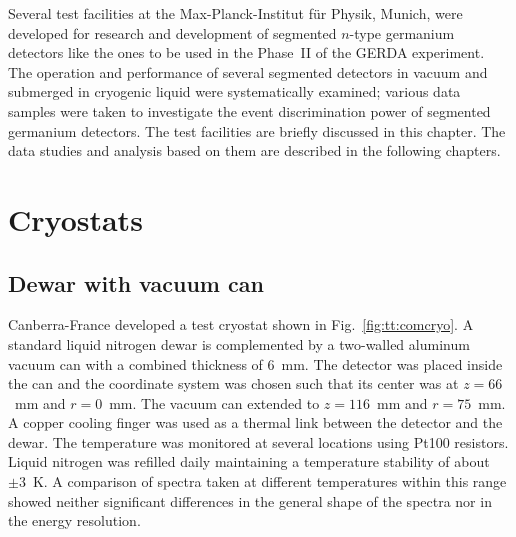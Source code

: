 Several test facilities at the Max-Planck-Institut f\"ur Physik, Munich, were developed for research and development of segmented $n$-type germanium detectors like the ones to be used in the Phase~II of the GERDA experiment. The operation and performance of several segmented detectors in vacuum and submerged in cryogenic liquid were systematically examined; various data samples were taken to investigate the event discrimination power of segmented germanium detectors. The test facilities are briefly discussed in this chapter. The data studies and analysis based on them are described in the following chapters.

\section{Cryostats}
\label{sec:tt:cryo}

\subsection{Dewar with vacuum can}
\label{sec:tt:comc}
Canberra-France developed a test cryostat shown in Fig.~\ref{fig:tt:comcryo}. A standard liquid nitrogen dewar is complemented by a two-walled aluminum vacuum can with a combined thickness of 6~mm. The detector was placed inside the can and the coordinate system was chosen such that its center was at $z=66$~mm and $r=0$~mm. The vacuum can extended to $z=116$~mm and $r=75$~mm. A copper cooling finger was used as a thermal link between the detector and the dewar. The temperature was monitored at several locations using Pt100 resistors. Liquid nitrogen was refilled daily maintaining a temperature stability of about $\pm3$~K. A comparison of spectra taken at different temperatures within this range showed neither significant differences in the general shape of the spectra nor in the energy resolution.

